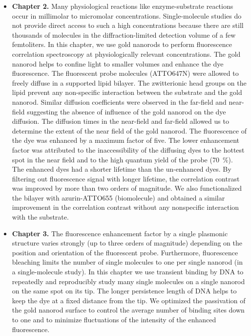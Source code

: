 \begin{itemize}
	\item \textbf{Chapter 2.} Many physiological reactions like enzyme-substrate reactions occur in millimolar to micromolar concentrations.
	Single-molecule studies do not provide direct access to such a high concentrations because there are still thousands of molecules in the diffraction-limited detection volume of a few femtoliters.
	In this chapter, we use gold nanorods to perform fluorescence correlation spectroscopy at physiologically relevant concentrations.
	The gold nanorod helps to confine light to smaller volumes and enhance the dye fluorescence.
	The fluorescent probe molecules (ATTO647N) were allowed to freely diffuse in a supported lipid bilayer.
	The zwitterionic head groups on the lipid prevent any non-specific interaction between the substrate and the gold nanorod.
	Similar diffusion coefficients were observed in the far-field and near-field suggesting the absence of influence of the gold nanorod on the dye diffusion.
	The diffusion times in the near-field and far-field allowed us to determine the extent of the near field of the gold nanorod.
	The fluorescence of the dye was enhanced by a maximum factor of five.
	The lower enhancement factor was attributed to the inaccessibility of the diffusing dyes to the hottest spot in the near field and to the high quantum yield of the probe (\SI{70}{\percent}).
	The enhanced dyes had a shorter lifetime than the un-enhanced dyes.
	By filtering out fluorescence signal with longer lifetime, the correlation contrast was improved by more than two orders of magnitude.
	We also functionalized the bilayer with azurin-ATTO655 (biomolecule) and obtained a similar improvement in the correlation contrast without any nonspecific interaction with the substrate.
	
	\item \textbf{Chapter 3.} The fluorescence enhancement factor by a single plasmonic structure varies strongly  (up to three orders of magnitude) depending on the position and orientation of the fluorescent probe.
	Furthermore, fluorescence bleaching limits the number of single molecules to one per single nanorod (in a single-molecule study).
	In this chapter we use transient binding by DNA to repeatedly and reproducibly study many single molecules on a single nanorod on the same spot on its tip.
	The longer persistence length of DNA helps to keep the dye at a fixed distance from the tip. We optimized the passivation of the gold nanorod surface to control the average number of binding sites down to one and to minimize fluctuations of the intensity of the enhanced fluorescence.


\end{itemize}
